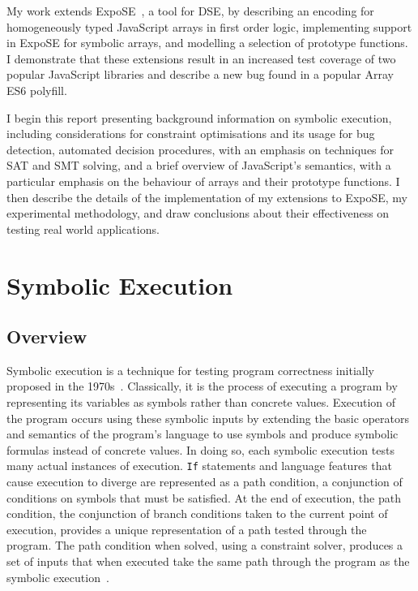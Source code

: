 \documentclass[]{final_report}
\begin{document}
My work extends ExpoSE~\cite{Loring_2017}, a tool for DSE, by describing an encoding for homogeneously typed JavaScript arrays in first order logic, implementing support in ExpoSE for symbolic arrays, and modelling a selection of prototype functions. I demonstrate that these extensions result in an increased test coverage of two popular JavaScript libraries and describe a new bug found in a popular Array ES6 polyfill.

I begin this report presenting background information on symbolic execution, including considerations for constraint optimisations and its usage for bug detection, automated decision procedures, with an emphasis on techniques for SAT and SMT solving, and a brief overview of JavaScript's semantics, with a particular emphasis on the behaviour of arrays and their prototype functions. I then describe the details of the implementation of my extensions to ExpoSE, my experimental methodology, and draw conclusions about their effectiveness on testing real world applications.

\chapter{Symbolic Execution}

\section{Overview}

Symbolic execution is a technique for testing program correctness initially proposed in the 1970s~\cite{king1976symbolic, boyer1975select}. Classically, it is the process of executing a program by representing its variables as symbols rather than concrete values. Execution of the program occurs using these symbolic inputs by extending the basic operators and semantics of the program's language to use symbols and produce symbolic formulas instead of concrete values. In doing so, each symbolic execution tests many actual instances of execution. \lstinline|If| statements and language features that cause execution to diverge are represented as a path condition, a conjunction of conditions on symbols that must be satisfied. At the end of execution, the path condition, the conjunction of branch conditions taken to the current point of execution, provides a unique representation of a path tested through the program. The path condition when solved, using a constraint solver, produces a set of inputs that when executed take the same path through the program as the symbolic execution~\cite{godefroid2008automated, godefroid2005dart}.
\end{document}
